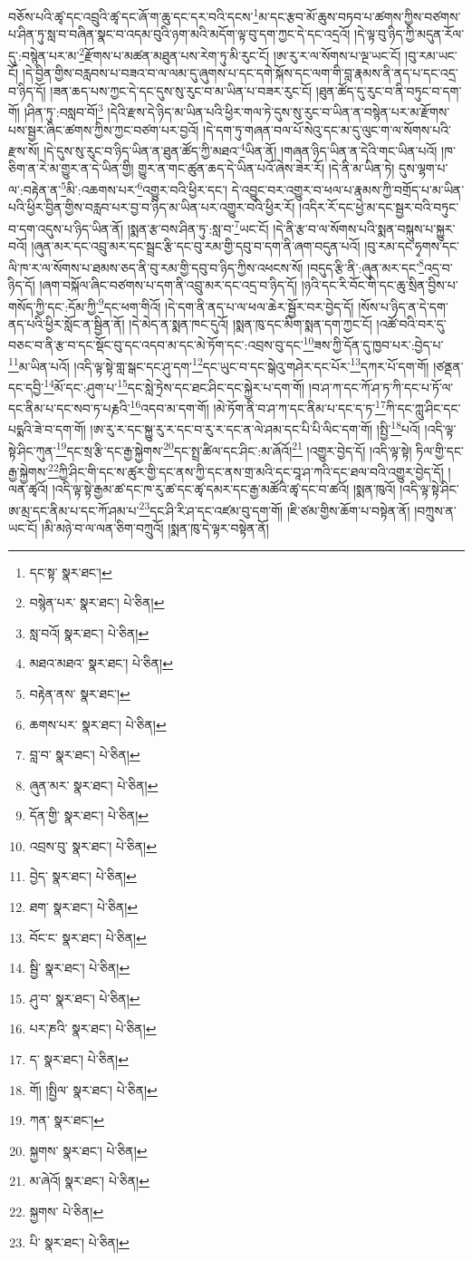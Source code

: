 བཅོས་པའི་ཚྭ་དང་འབྲུའི་ཚྭ་དང་ཞོ་ག་ཆུ་དང་དར་བའི་དངས་\footnote{དང་སྟ་  སྣར་ཐང་། }མ་དང་རྩབ་མོ་ཆུས་བཏབ་པ་ཚགས་ཀྱིས་བཙགས་པ་ཤིན་ཏུ་སླ་བ་བཞིན་སྣང་བ་འདམ་བུའི་ཉག་མའི་མདོག་ལྟ་བུ་དག་ཀྱང་དེ་དང་འདྲའོ། །དེ་ལྟ་བུ་ཉིད་ཀྱི་མདུན་རོལ་དུ་:བསྙེན་པར་མ་\footnote{བསྙེན་པར་  སྣར་ཐང་།  པེ་ཅིན། }རྫོགས་པ་མཚན་མཐུན་པས་རེག་ཏུ་མི་རུང་ངོ། །ཨ་རུ་ར་ལ་སོགས་པ་ལྔ་ཡང་ངོ། །བུ་རམ་ཡང་ངོ། །དེ་བྱིན་གྱིས་བརླབས་པ་བཟའ་བ་ལ་ལམ་དུ་ཞུགས་པ་དང་དགེ་སྐོས་དང་ལག་གི་བླ་རྣམས་ནི་ནད་པ་དང་འདྲ་བ་ཉིད་དོ། །ཟན་ཆད་པས་ཀྱང་དེ་དང་དུས་སུ་རུང་བ་མ་ཡིན་པ་བཟར་རུང་ངོ། །ཐུན་ཚོད་དུ་རུང་བ་ནི་བཏུང་བ་དག་གོ། །ཤིན་ཏུ་:བསླབ་བོ།\footnote{སླ་བའོ།  སྣར་ཐང་།  པེ་ཅིན། } །དེའི་རྫས་དེ་ཉིད་མ་ཡིན་པའི་ཕྱིར་གལ་ཏེ་དུས་སུ་རུང་བ་ཡིན་ན་བསྙེན་པར་མ་རྫོགས་པས་སྦྱར་ཞིང་ཚགས་ཀྱིས་ཀྱང་བཙག་པར་བྱའོ། །དེ་དག་ཏུ་གཞན་བལ་པོ་སེའུ་དང་མ་དུ་ལུང་ག་ལ་སོགས་པའི་རྫས་སོ། །དེ་དུས་སུ་རུང་བ་ཉིད་ཡིན་ན་ཐུན་ཚོད་ཀྱི་མཐའ་\footnote{མཐའ་མཐའ་  སྣར་ཐང་།  པེ་ཅིན། }ཡིན་ནོ། །གཞན་ཉིད་ཡིན་ན་དེའི་གང་ཡིན་པའོ། །ཁ་ཅིག་ན་རེ་མ་གྱུར་ན་དེ་ཡིན་གྱི། གྱུར་ན་གང་ཚུན་ཆད་དེ་ཡིན་པའོ་ཞེས་ཟེར་རོ། །དེ་ནི་མ་ཡིན་ཏེ། དུས་ལྷག་པ་ལ་:བརྟེན་ན་\footnote{བརྟེན་ནས་  སྣར་ཐང་། }མི་:འཆགས་པར་\footnote{ཆགས་པར་  སྣར་ཐང་།  པེ་ཅིན། }འགྱུར་བའི་ཕྱིར་དང་། དེ་འབྱུང་བར་འགྱུར་བ་ཕལ་པ་རྣམས་ཀྱི་བགྲོད་པ་མ་ཡིན་པའི་ཕྱིར་བྱིན་གྱིས་བརླབ་པར་བྱ་བ་ཉིད་མ་ཡིན་པར་འགྱུར་བའི་ཕྱིར་རོ། །འདིར་རོ་དང་ཕྱེ་མ་དང་སྦྱར་བའི་བཏུང་བ་དག་འདུས་པ་ཉིད་ཡིན་ནོ། །སྨན་རྩ་བས་ཤིན་ཏུ་:སླ་བ་\footnote{བླ་བ་  སྣར་ཐང་།  པེ་ཅིན། }ཡང་ངོ། །དེ་ནི་རྩ་བ་ལ་སོགས་པའི་སྨན་བསྐུས་པ་སྐྱུར་བའོ། །ཞུན་མར་དང་འབྲུ་མར་དང་སྦྲང་རྩི་དང་བུ་རམ་གྱི་དབུ་བ་དག་ནི་ཞག་བདུན་པའོ། །བུ་རམ་དང་ཧྭགས་དང་ལི་ཁ་ར་ལ་སོགས་པ་ཐམས་ཅད་ནི་བུ་རམ་གྱི་དབུ་བ་ཉིད་ཀྱིས་འཕངས་སོ། །བདུད་རྩི་ནི་:ཞུན་མར་དང་\footnote{ཞུན་མར་  སྣར་ཐང་།  པེ་ཅིན། }འདྲ་བ་ཉིད་དོ། །ཞག་བསྐོལ་ཞིང་བཙགས་པ་དག་ནི་འབྲུ་མར་དང་འདྲ་བ་ཉིད་དོ། །ཉའི་དང་རི་བོང་གི་དང་ཆུ་སྲིན་བྱིས་པ་གསོད་ཀྱི་དང་:དོམ་ཀྱི་\footnote{དོན་གྱི་  སྣར་ཐང་།  པེ་ཅིན། }དང་ཕག་གིའོ། །དེ་དག་ནི་ནད་པ་ལ་ཕལ་ཆེར་སྦྱོར་བར་བྱེད་དོ། །སོས་པ་ཉིད་ན་དེ་དག་ནད་པའི་ཕྱིར་སློང་ན་སྦྱིན་ནོ། །དེ་མེད་ན་སྨན་ཁང་དུའོ། །སྨན་ཁུ་དང་མིག་སྨན་དག་ཀྱང་ངོ། །འཚོ་བའི་བར་དུ་བཅང་བ་ནི་རྩ་བ་དང་སྡོང་བུ་དང་འདབ་མ་དང་མེ་ཏོག་དང་:འབྲས་བུ་དང་\footnote{འབྲས་བུ་  སྣར་ཐང་།  པེ་ཅིན། }ཟས་ཀྱི་དོན་དུ་ཁྱབ་པར་:བྱེད་པ་\footnote{བྱེད་  སྣར་ཐང་།  པེ་ཅིན། }མ་ཡིན་པའོ། །འདི་ལྟ་སྟེ་གླ་སྒང་དང་ཤུ་དག་\footnote{ཐག་  སྣར་ཐང་།  པེ་ཅིན། }དང་ཡུང་བ་དང་སྒེའུ་གཤེར་དང་པོར་\footnote{བོང་ང་  སྣར་ཐང་།  པེ་ཅིན། }དཀར་པོ་དག་གོ། །ཙནྡན་དང་དབྱི་\footnote{སྦྱི་  སྣར་ཐང་།  པེ་ཅིན། }མོ་དང་:ཤུག་པ་\footnote{ཤུ་བ་  སྣར་ཐང་།  པེ་ཅིན། }དང་སླེ་ཏྲེས་དང་ཐང་ཤིང་དང་སྐྱེར་པ་དག་གོ། །བ་ཤ་ཀ་དང་ཀོ་ཤ་ཏ་ཀི་དང་པ་ཏོ་ལ་དང་ནིམ་པ་དང་སབ་ཏ་པརྞའི་\footnote{པར་ཎའི་  སྣར་ཐང་།  པེ་ཅིན། }འདབ་མ་དག་གོ། །མེ་ཏོག་ནི་བ་ཤ་ཀ་དང་ནིམ་པ་དང་ད་ཏ་\footnote{ད་  སྣར་ཐང་།  པེ་ཅིན། }ཀི་དང་ཀླུ་ཤིང་དང་པདྨའི་ཟེ་བ་དག་གོ། །ཨ་རུ་ར་དང་སྐྱུ་རུ་ར་དང་བ་རུ་ར་དང་ན་ལེ་ཤམ་དང་པི་པི་ལིང་དག་གོ། །སྤྱི་\footnote{གོ། །སྤྱིལ་  སྣར་ཐང་།  པེ་ཅིན། }པའོ། །འདི་ལྟ་སྟེ་ཤིང་ཀུན་\footnote{ཀན་  སྣར་ཐང་། }དང་སྲ་རྩི་དང་རྒྱ་སྐྱེགས་\footnote{སྐྱགས་  སྣར་ཐང་།  པེ་ཅིན། }དང་སྤྲ་ཚིལ་དང་ཤིང་:མ་ཞོའོ།\footnote{མ་ཞེའོ།  སྣར་ཐང་།  པེ་ཅིན། } །འགྱུར་བྱེད་དོ། །འདི་ལྟ་སྟེ། ཏིལ་གྱི་དང་རྒྱ་སྐྱེགས་\footnote{སྐྱགས་  པེ་ཅིན། }ཀྱི་ཤིང་གི་དང་ས་ཚུར་གྱི་དང་ནས་ཀྱི་དང་ནས་གྲ་མའི་དང་བཱ་ཤ་ཀའི་དང་ཐལ་བའི་འགྱུར་བྱེད་དོ། །ལན་ཚྭའོ། །འདི་ལྟ་སྟེ་རྒྱམ་ཚ་དང་ཁ་རུ་ཚ་དང་ཚྭ་དམར་དང་རྒྱ་མཚོའི་ཚྭ་དང་བ་ཚའོ། །སྨན་ཁུའོ། །འདི་ལྟ་སྟེ་ཤིང་ཨ་མྲ་དང་ནིམ་པ་དང་ཀོ་ཤམ་པ་\footnote{པི་  སྣར་ཐང་།  པེ་ཅིན། }དང་ཤི་རི་ཤ་དང་འཛམ་བུ་དག་གོ། །ཇི་ཙམ་གྱིས་ཆོག་པ་བསྟེན་ནོ། །བཀྲུས་ན་ཡང་ངོ། །མི་མཉེ་བ་ལ་ལན་ཅིག་བཀྲུའོ། །སྨན་ཁུ་དེ་ལྟར་བསྟེན་ནོ། 